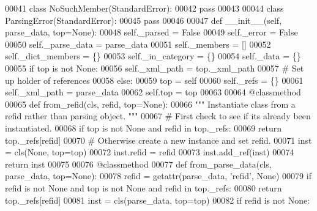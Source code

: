 \begin{DoxyCode}
00041     \textcolor{keyword}{class }NoSuchMember(StandardError):
00042         \textcolor{keywordflow}{pass}
00043 
00044     \textcolor{keyword}{class }ParsingError(StandardError):
00045         \textcolor{keywordflow}{pass}
00046 
00047     \textcolor{keyword}{def }__init__(self, parse\_data, top=None):
00048         self._parsed = \textcolor{keyword}{False}
00049         self._error = \textcolor{keyword}{False}
00050         self._parse_data = parse\_data
00051         self._members = []
00052         self._dict_members = \{\}
00053         self._in_category = \{\}
00054         self._data = \{\}
00055         \textcolor{keywordflow}{if} top \textcolor{keywordflow}{is} \textcolor{keywordflow}{not} \textcolor{keywordtype}{None}:
00056             self._xml_path = top.\_xml\_path
00057             \textcolor{comment}{# Set up holder of references}
00058         \textcolor{keywordflow}{else}:
00059             top = self
00060             self._refs = \{\}
00061             self._xml_path = parse\_data
00062         self.top = top
00063 
00064     @classmethod
00065     \textcolor{keyword}{def }from_refid(cls, refid, top=None):
00066         \textcolor{stringliteral}{""" Instantiate class from a refid rather than parsing object. """}
00067         \textcolor{comment}{# First check to see if its already been instantiated.}
00068         \textcolor{keywordflow}{if} top \textcolor{keywordflow}{is} \textcolor{keywordflow}{not} \textcolor{keywordtype}{None} \textcolor{keywordflow}{and} refid \textcolor{keywordflow}{in} top.\_refs:
00069             \textcolor{keywordflow}{return} top.\_refs[refid]
00070         \textcolor{comment}{# Otherwise create a new instance and set refid.}
00071         inst = cls(\textcolor{keywordtype}{None}, top=top)
00072         inst.refid = refid
00073         inst.add\_ref(inst)
00074         \textcolor{keywordflow}{return} inst
00075 
00076     @classmethod
00077     \textcolor{keyword}{def }from_parse_data(cls, parse\_data, top=None):
00078         refid = getattr(parse\_data, \textcolor{stringliteral}{'refid'}, \textcolor{keywordtype}{None})
00079         \textcolor{keywordflow}{if} refid \textcolor{keywordflow}{is} \textcolor{keywordflow}{not} \textcolor{keywordtype}{None} \textcolor{keywordflow}{and} top \textcolor{keywordflow}{is} \textcolor{keywordflow}{not} \textcolor{keywordtype}{None} \textcolor{keywordflow}{and} refid \textcolor{keywordflow}{in} top.\_refs:
00080             \textcolor{keywordflow}{return} top.\_refs[refid]
00081         inst = cls(parse\_data, top=top)
00082         \textcolor{keywordflow}{if} refid \textcolor{keywordflow}{is} \textcolor{keywordflow}{not} \textcolor{keywordtype}{None}:

\end{DoxyCode}
